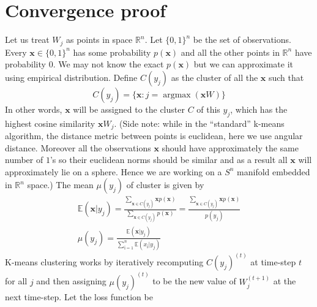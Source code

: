 \documentclass[12pt]{article}
\DeclareMathOperator*{\argmax}{argmax}
\begin{document}
\section{Convergence proof}

Let us treat $W_j$ as points in space $\mathbb{R}^n$. Let $\{0,1\}^n$  be the set of observations. Every $\boldsymbol{x}\in \{0,1\}^n$ has some probability $p(\boldsymbol{x})$ and all the other points in $\mathbb{R}^n$ have probability $0$. We may not know the exact $p(\boldsymbol{x})$ but we can approximate it using empirical distribution. Define $C(y_j)$ as the cluster of all the $\boldsymbol{x}$ such that
\[
 C(y_j) = \{\boldsymbol{x} :  j = \argmax(\boldsymbol{x} W) \} 
\]
In other words, $\boldsymbol{x}$ will be assigned to the cluster $C$ of this  $y_j$, which has the highest cosine similarity $\boldsymbol{x}W_j$. (Side note: while in the ``standard'' k-means algorithm, the distance metric between points is euclidean, here we use angular distance. Moreover all the observations $\boldsymbol{x}$ should have approximately the same number of $1$'s so their euclidean norms should be similar and as a result all $\boldsymbol{x}$ will approximately lie on a sphere.  Hence we are working on a $S^n$ manifold embedded in $\mathbb{R}^n$ space.)  The mean $\mu(y_j)$ of cluster is given by 
\begin{gather*}
	\mathbb{E}(\boldsymbol{x}|y_j) = \frac{\sum_{\boldsymbol{x}\in C(y_j)} \boldsymbol{x}p(\boldsymbol{x})}{\sum_{\boldsymbol{x}\in C(y_j)} p(\boldsymbol{x})} = \frac{\sum_{\boldsymbol{x}\in C(y_j)} \boldsymbol{x}p(\boldsymbol{x})}{p(y_j)} \\
	\mu(y_j)  = \frac{\mathbb{E}(\boldsymbol{x}|y_j)}{\sum_{ï=1}^{n}\mathbb{E}(x_{ï}|y_j)}
\end{gather*}
K-means clustering works by iteratively recomputing $C(y_j)^{(t)}$ at time-step $t$ for all $j$ and then assigning $\mu(y_j)^{(t)}$ to be the new value of $W_j^{(t+1)}$ at the next time-step. Let the loss function be
\end{document}
